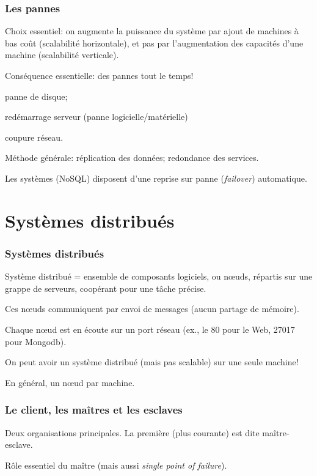 \begin{frame}
\frametitle{Les pannes}

Choix essentiel: \alert{on augmente la puissance du système par ajout de machines
à bas coût (scalabilité horizontale)}, et pas par l'augmentation des capacités
d'une machine (scalabilité verticale).

\vfill

Conséquence essentielle: des pannes tout le temps!

\begin{redbullet}
  \item panne de disque;
  \item redémarrage serveur (panne logicielle/matérielle)
  \item coupure réseau.
\end{redbullet}

Méthode générale: réplication des données; redondance des services.

\vfill

Les systèmes (NoSQL) disposent d'une reprise sur panne (\textit{failover}) \alert{automatique}.

\end{frame}

\section{Systèmes distribués}



\begin{frame}
\frametitle{Systèmes distribués}

Système distribué = ensemble de composants logiciels, ou \alert{nœuds}, répartis sur une \alert{grappe de serveurs},
coopérant pour une tâche précise.

\vfill

Ces nœuds communiquent par \alert{envoi de messages} (aucun partage de mémoire). 


\vfill

Chaque nœud est en écoute sur un port réseau (ex., le 80 pour le Web, 27017 pour Mongodb).

\vfill

On peut avoir un système distribué (mais pas scalable) sur une seule machine! 

\vfill
 En général,
un nœud par machine.

\end{frame}


\begin{frame}
\frametitle{Le client, les maîtres et les esclaves}

Deux organisations principales. La première (plus courante) est
dite \alert{maître-esclave}.

\vfill



\vfill

Rôle essentiel du maître (mais aussi \textit{single point of failure}).


\end{frame}


